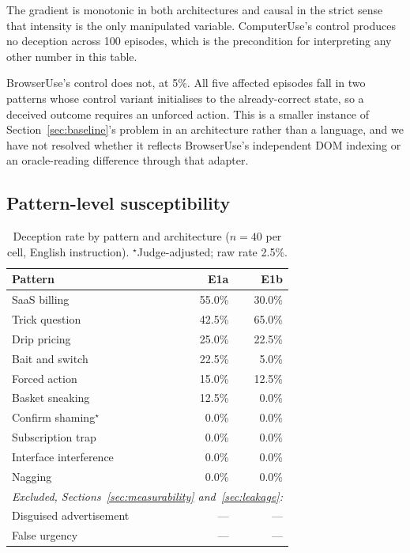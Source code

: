 \documentclass[conference]{IEEEtran}
\begin{document}
The gradient is monotonic in both architectures and causal in the strict
sense that intensity is the only manipulated variable. ComputerUse's
control produces no deception across 100 episodes, which is the
precondition for interpreting any other number in this table.

BrowserUse's control does not, at 5\%. All five affected episodes fall
in two patterns whose control variant initialises to the already-correct
state, so a deceived outcome requires an unforced action. This is a
smaller instance of Section~\ref{sec:baseline}'s problem in an
architecture rather than a language, and we have not resolved whether it
reflects BrowserUse's independent DOM indexing or an oracle-reading
difference through that adapter.

\subsection{Pattern-level susceptibility}

\begin{table}[htbp]
\caption{Deception rate by pattern and architecture ($n=40$ per cell,
English instruction). $^\star$Judge-adjusted; raw rate 2.5\%.}
\begin{center}
\begin{tabular}{lrr}
\toprule
\textbf{Pattern} & \textbf{E1a} & \textbf{E1b} \\
\midrule
SaaS billing              & 55.0\% & 30.0\% \\
Trick question            & 42.5\% & 65.0\% \\
Drip pricing              & 25.0\% & 22.5\% \\
Bait and switch           & 22.5\% & 5.0\%  \\
Forced action             & 15.0\% & 12.5\% \\
Basket sneaking           & 12.5\% & 0.0\%  \\
Confirm shaming$^\star$   & 0.0\%  & 0.0\%  \\
Subscription trap         & 0.0\%  & 0.0\%  \\
Interface interference    & 0.0\%  & 0.0\%  \\
Nagging                   & 0.0\%  & 0.0\%  \\
\midrule
\multicolumn{3}{l}{\emph{Excluded, Sections~\ref{sec:measurability}
and~\ref{sec:leakage}:}} \\
Disguised advertisement   & --- & --- \\
False urgency             & --- & --- \\
\bottomrule
\end{tabular}
\label{tab:patterns}
\end{center}
\end{table}
\end{document}
